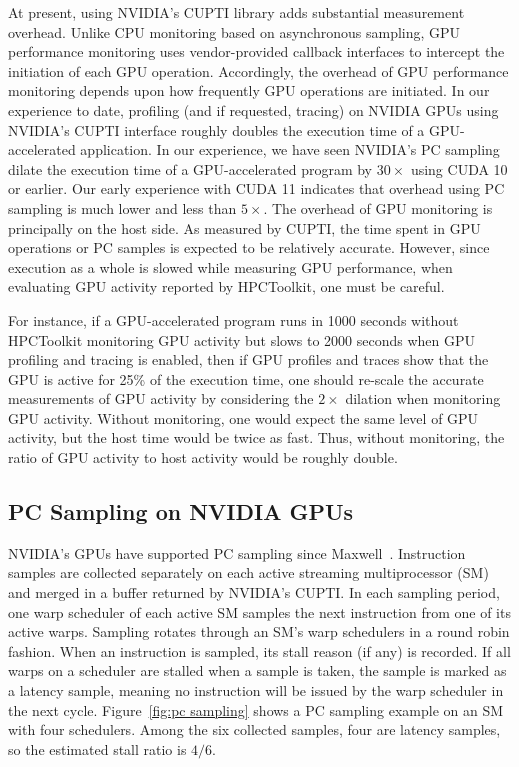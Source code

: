 At present, using NVIDIA's CUPTI library adds substantial measurement overhead.  Unlike CPU monitoring based on asynchronous sampling, GPU performance monitoring uses vendor-provided callback interfaces to intercept the initiation of each GPU operation. Accordingly,  the overhead of GPU performance monitoring depends upon how frequently GPU operations are initiated.
In our experience to date, profiling (and if requested, tracing) on NVIDIA GPUs using NVIDIA's CUPTI interface roughly doubles the execution time of a GPU-accelerated application. In our experience, we have seen NVIDIA's PC sampling dilate the execution time of a GPU-accelerated program by $30\times$ using CUDA 10 or earlier.  Our early experience with CUDA 11 indicates that overhead using PC sampling is much lower and less than $5\times$. The overhead of GPU monitoring is principally on the host side. As measured by CUPTI, the time spent in GPU operations or PC samples is expected to be relatively accurate. However, since execution as a whole is slowed while measuring GPU performance, when evaluating GPU activity reported by HPCToolkit, one must be careful.

For instance, if a GPU-accelerated program runs in 1000 seconds without HPCToolkit monitoring GPU activity but slows to 2000 seconds when GPU profiling and tracing is enabled, then if GPU profiles and traces show that the GPU is active for 25\% of the execution time, one should  re-scale the accurate measurements of GPU activity by considering the $2\times$ dilation when monitoring GPU activity. Without monitoring, one would expect the same level of GPU activity, but the host time would be twice as fast. Thus, without monitoring, the ratio of GPU activity to host activity would be roughly double.


\subsection{PC Sampling on NVIDIA GPUs}
\label{nvidia-pc-sampling}

NVIDIA's GPUs have supported PC sampling since Maxwell~\cite{cuptipcsampling}.
Instruction samples are collected separately on each active streaming
multiprocessor (SM) and merged in a buffer returned by NVIDIA's CUPTI.
In each sampling period, one warp scheduler of each active SM
samples the next instruction from one of its active warps. Sampling rotates through
an SM's warp schedulers in a round robin fashion.
When an instruction is sampled, its stall reason (if any) is
recorded. If all warps on a scheduler are stalled when a sample is
taken, the sample is marked as a latency sample, meaning no instruction will be issued by the warp scheduler in the next cycle.
Figure~\ref{fig:pc sampling} shows a PC sampling example on an SM with four schedulers. Among the six collected samples, four are latency samples, so the estimated stall ratio is $4/6$.

